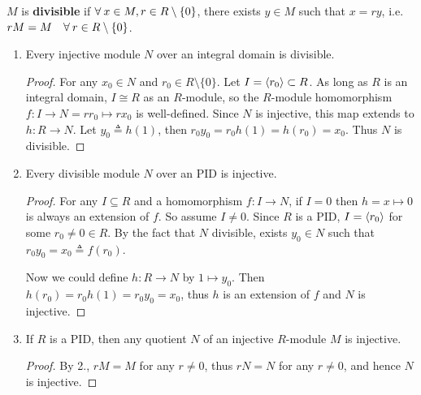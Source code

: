\begin{definition}
  $M$ is {\bf divisible} if $\forall x\in M, r \in R \setminus \set{0}$, there exists
  $y \in M$ such that $x = ry$, i.e. $rM = M \quad \forall r \in R \setminus \set{0}$.
\end{definition}

\begin{prop} \mbox{} \label{prop:injective-and-divisible}
  \begin{enumerate}
    \item Every injective module $N$ over an integral domain is divisible.
      \begin{proof}
        For any $x_0 \in N$ and $r_0 \in R \setminus \{0\}$. Let
        $I = \langle r_0\rangle \subset R$. As long as $R$ is an integral domain,
        $I \cong R$ as an $R$-module, so the $R$-module homomorphism
        $f : I \to N = r r_0 \mapsto r x_0$ is well-defined.
        Since $N$ is injective, this map extends to $h : R \to N$.
        Let $y_0 \triangleq h(1)$, then $r_0 y_0 = r_0 h(1) = h(r_0) = x_0$.
        Thus $N$ is divisible.
      \end{proof}
    \item Every divisible module $N$ over an PID is injective.
      \begin{proof}
        For any $I \subseteq R$ and a homomorphism $f : I \to N$, if $I = 0$ then
        $h = x \mapsto 0$ is always an extension of $f$.
        So assume $I \neq 0$. Since $R$ is a PID,
        $I = \langle r_0\rangle$ for some $r_0 \neq 0 \in R$.
        By the fact that $N$ divisible, exists $y_0 \in N$
        such that $r_0 y_0 = x_0 \triangleq f(r_0)$.

        Now we could define $h : R \to N$ by $1 \mapsto y_0$.
        Then $h(r_0) = r_0 h(1) = r_0 y_0 = x_0$, thus
        $h$ is an extension of $f$ and $N$ is injective.
     \end{proof}
     \item If $R$ is a PID, then any quotient $N$ of an injective $R$-module $M$
       is injective.
       \begin{proof}
        By 2., $rM = M$ for any $r \neq 0$, thus $rN = N$ for any $r \neq 0$,
        and hence $N$ is injective.
       \end{proof}
  \end{enumerate}
\end{prop}

